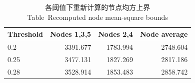\begin{table}[htbp]\centering\small
\caption{各阈值下重新计算的节点均方上界\\ Table~\thetable\quad Recomputed node mean-square bounds}\label{tab:matchedcert}
\begin{tabular}{lrrr}\toprule Threshold & Nodes 1,3,5 & Nodes 2,4 & Node average\\\midrule
0.2 & 3391.677 & 1783.994 & 2748.604\\
0.25 & 3477.131 & 1827.269 & 2817.186\\
0.28 & 3528.914 & 1853.483 & 2858.742\\
\bottomrule\end{tabular}
\end{table}